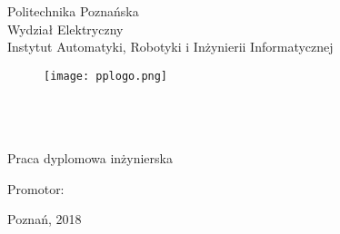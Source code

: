 \thispagestyle{empty}
\setcounter{page}{0}
\begin{center}
	\vspace{-10mm}
Politechnika Poznańska\\
Wydział Elektryczny\\  
Instytut Automatyki, Robotyki i Inżynierii Informatycznej\\
  \vspace{8mm}
\begin{figure}[ht!]
\centering
\texttt{[image: pplogo.png]}
\end{figure}
  \vspace{8mm}
\Large{\StudentA}\\
\Large{\StudentB}\\
  \vspace{10mm}
\LARGE{\TytulPolski}\\
  \vspace{10mm}
\Large{Praca dyplomowa inżynierska}\\
\end{center}
\vspace{40mm}
\begin{flushright}
{\large Promotor:\\
\Promotor}
\end{flushright}

\vspace{15mm}
\begin{center}
Poznań, 2018
\end{center}
 

